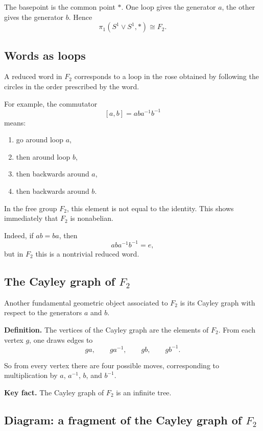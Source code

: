 \documentclass[12pt,a4paper]{article}
\theoremstyle{notespace}
\begin{document}
The basepoint is the common point \(*\). One loop gives the generator \(a\), the other gives the generator \(b\). Hence
\[
\pi_1(S^1\vee S^1,*)\cong F_2.
\]

\bigskip

\subsection{Words as loops}

A reduced word in \(F_2\) corresponds to a loop in the rose obtained by following the circles in the order prescribed by the word.

For example, the commutator
\[
[a,b]=aba^{-1}b^{-1}
\]
means:
\begin{enumerate}
	\item go around loop \(a\),
	\item then around loop \(b\),
	\item then backwards around \(a\),
	\item then backwards around \(b\).
\end{enumerate}

In the free group \(F_2\), this element is not equal to the identity. This shows immediately that \(F_2\) is nonabelian.

Indeed, if \(ab=ba\), then
\[
aba^{-1}b^{-1}=e,
\]
but in \(F_2\) this is a nontrivial reduced word.

\bigskip

\subsection{The Cayley graph of \texorpdfstring{$F_2$}{F2}}

Another fundamental geometric object associated to \(F_2\) is its Cayley graph with respect to the generators \(a\) and \(b\).

\medskip

\textbf{Definition.}
The vertices of the Cayley graph are the elements of \(F_2\). From each vertex \(g\), one draws edges to
\[
ga,\qquad ga^{-1},\qquad gb,\qquad gb^{-1}.
\]

So from every vertex there are four possible moves, corresponding to multiplication by \(a\), \(a^{-1}\), \(b\), and \(b^{-1}\).

\medskip

\textbf{Key fact.}
The Cayley graph of \(F_2\) is an infinite tree.

\bigskip

\subsection{Diagram: a fragment of the Cayley graph of \texorpdfstring{$F_2$}{F2}}
\end{document}
